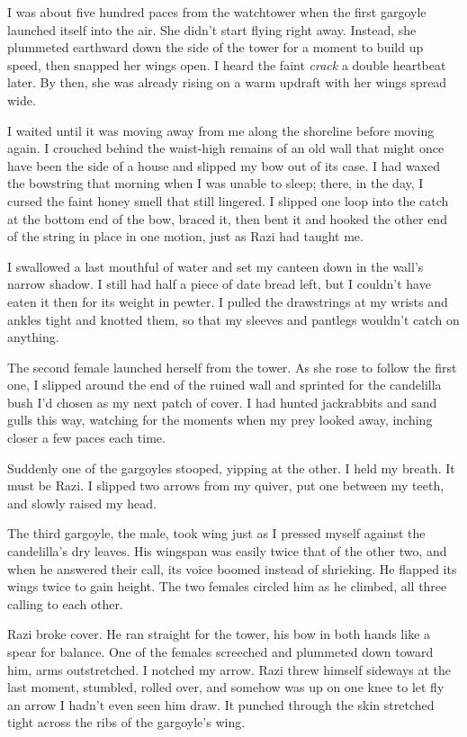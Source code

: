 I was about five hundred paces from the watchtower when the first
gargoyle launched itself into the air.  She didn't start flying right
away.  Instead, she plummeted earthward down the side of the tower for
a moment to build up speed, then snapped her wings open.  I heard the
faint \emph{crack} a double heartbeat later.  By then, she was already
rising on a warm updraft with her wings spread wide.

I waited until it was moving away from me along the shoreline before
moving again.  I crouched behind the waist-high remains of an old wall
that might once have been the side of a house and slipped my bow out
of its case.  I had waxed the bowstring that morning when I was unable
to sleep; there, in the day, I cursed the faint honey smell that still
lingered.  I slipped one loop into the catch at the bottom end of the
bow, braced it, then bent it and hooked the other end of the string in
place in one motion, just as Razi had taught me.

I swallowed a last mouthful of water and set my canteen down in the
wall's narrow shadow.  I still had half a piece of date bread left,
but I couldn't have eaten it then for its weight in pewter.  I pulled
the drawstrings at my wrists and ankles tight and knotted them, so
that my sleeves and pantlegs wouldn't catch on anything.

The second female launched herself from the tower.  As she rose to
follow the first one, I slipped around the end of the ruined wall and
sprinted for the candelilla bush I'd chosen as my next patch of cover.
I had hunted jackrabbits and sand gulls this way, watching for the
moments when my prey looked away, inching closer a few paces each
time.

Suddenly one of the gargoyles stooped, yipping at the other.  I held
my breath.  It must be Razi.  I slipped two arrows from my quiver, put
one between my teeth, and slowly raised my head.

The third gargoyle, the male, took wing just as I pressed myself
against the candelilla's dry leaves.  His wingspan was easily twice
that of the other two, and when he answered their call, its voice
boomed instead of shrieking.  He flapped its wings twice to gain
height.  The two females circled him as he climbed, all three calling
to each other.

Razi broke cover.  He ran straight for the tower, his bow in both
hands like a spear for balance.  One of the females screeched and
plummeted down toward him, arms outstretched.  I notched my arrow.
Razi threw himself sideways at the last moment, stumbled, rolled over,
and somehow was up on one knee to let fly an arrow I hadn't even seen
him draw.  It punched through the skin stretched tight across the ribs
of the gargoyle's wing.

